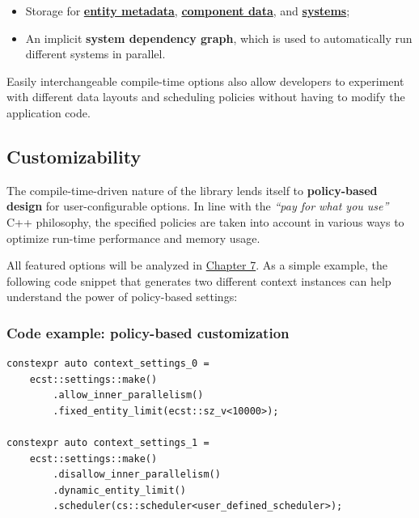 \documentclass[twoside, 12pt, a4paper, openany]{book}
\begin{document}
\begin{itemize}
\item
  Storage for \protect\hyperlink{storage_entity}{\textbf{entity
  metadata}}, \protect\hyperlink{storage_component}{\textbf{component
  data}}, and \protect\hyperlink{storage_system}{\textbf{systems}};
\item
  An implicit \textbf{system dependency graph}, which is used to
  automatically run different systems in parallel.
\end{itemize}

Easily interchangeable compile-time options also allow developers to
experiment with different data layouts and scheduling policies without
having to modify the application code.

\subsection{Customizability}\label{customizability}

The compile-time-driven nature of the library lends itself to
\textbf{policy-based design} for user-configurable options. In line with
the \emph{``pay for what you use''} C++ philosophy, the specified
policies are taken into account in various ways to optimize run-time
performance and memory usage.

All featured options will be analyzed in
\protect\hyperlink{chap_ecst_compiletime}{Chapter 7}. As a simple
example, the following code snippet that generates two different context
instances can help understand the power of policy-based settings:

\subsubsection{Code example: policy-based
customization}\label{code-example-policy-based-customization}

\begin{verbatim}
constexpr auto context_settings_0 =
    ecst::settings::make()
        .allow_inner_parallelism()
        .fixed_entity_limit(ecst::sz_v<10000>);

constexpr auto context_settings_1 =
    ecst::settings::make()
        .disallow_inner_parallelism()
        .dynamic_entity_limit()
        .scheduler(cs::scheduler<user_defined_scheduler>);
\end{verbatim}
\end{document}
